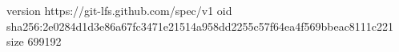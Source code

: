 version https://git-lfs.github.com/spec/v1
oid sha256:2e0284d1d3e86a67fc3471e21514a958dd2255c57f64ea4f569bbeac8111c221
size 699192
